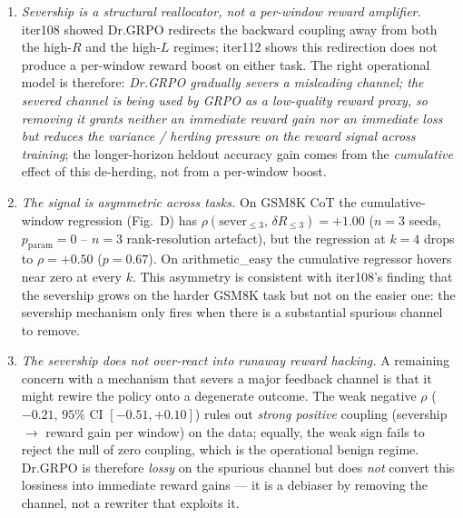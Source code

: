 \begin{enumerate}
\item \emph{Severship is a structural reallocator, not a per-window
reward amplifier.}  iter108 showed Dr.GRPO redirects the backward
coupling away from both the high-$R$ and the high-$L$ regimes; iter112
shows this redirection does not produce a per-window reward boost on
either task.  The right operational model is therefore: \emph{Dr.GRPO
gradually severs a misleading channel; the severed channel is being
used by GRPO as a low-quality reward proxy, so removing it grants
neither an immediate reward gain \emph{nor} an immediate loss but
reduces the variance / herding pressure on the reward signal across
training}; the longer-horizon heldout accuracy gain comes from the
\emph{cumulative} effect of this de-herding, not from a per-window
boost.

\item \emph{The signal is asymmetric across tasks.}
On GSM8K CoT the cumulative-window regression (Fig.~D) has
$\rho(\mathrm{sever}_{\le 3},\,\delta R_{\le 3})=+1.00$ ($n{=}3$
seeds, $p_{\mathrm{param}}{=}0$ -- $n{=}3$ rank-resolution
artefact), but the regression at $k{=}4$ drops to $\rho=+0.50$
($p{=}0.67$).  On arithmetic\_easy the cumulative regressor hovers
near zero at every $k$.  This asymmetry is consistent with iter108's
finding that the severship grows on the harder GSM8K task but not on
the easier one: the severship mechanism only fires when there is a
substantial spurious channel to remove.

\item \emph{The severship does \emph{not} over-react into runaway reward
hacking.}  A remaining concern with a mechanism that severs a major
feedback channel is that it might rewire the policy onto a degenerate
outcome.  The weak negative $\rho$ ($-0.21$, $95\%$ CI
$[-0.51,+0.10]$) rules out \emph{strong positive} coupling
(severship $\to$ reward gain per window) on the data; equally, the
weak sign fails to reject the null of zero coupling, which is the
operational benign regime.  Dr.GRPO is therefore \emph{lossy} on the
spurious channel but does \emph{not} convert this lossiness into
immediate reward gains --- it is a debiaser by removing the channel,
not a rewriter that exploits it.
\end{enumerate}

